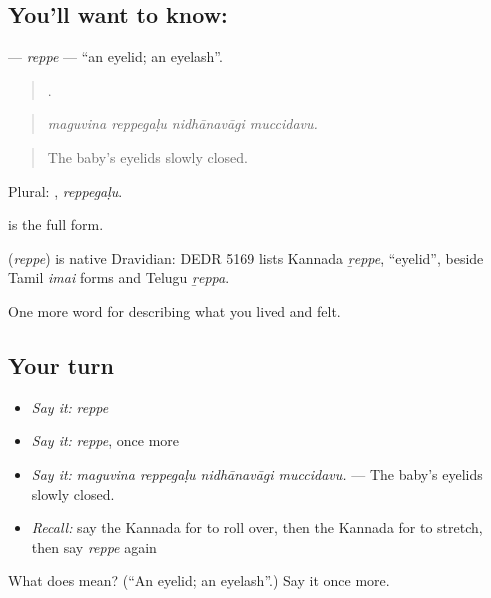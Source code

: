 \subsection*{You'll want to know: }
\textbf{} — \emph{reppe} — \textquotedblleft{}an eyelid; an eyelash\textquotedblright{}.

\begin{quote}
   .
\end{quote}

\begin{quote}
\emph{maguvina reppegaḷu nidhānavāgi muccidavu.}
\end{quote}

\begin{quote}
The baby's eyelids slowly closed.
\end{quote}

Plural: , \emph{reppegaḷu}.

 is the full form.

\begin{cousinweb}
\textbf{} (\emph{reppe}) is native Dravidian: DEDR 5169 lists Kannada \emph{ṟeppe}, \textquotedblleft{}eyelid\textquotedblright{}, beside Tamil \emph{imai} forms and Telugu \emph{ṟeppa}.
\end{cousinweb}

\begin{grammarlens}[title={What you've built}]
One more word for describing what you lived and felt.
\end{grammarlens}

\subsection*{Your turn}
\begin{itemize}
\raggedright
  \item \emph{Say it:} \emph{reppe}
  \item \emph{Say it:} \emph{reppe}, once more
  \item \emph{Say it:} \emph{maguvina reppegaḷu nidhānavāgi muccidavu.} — The baby's eyelids slowly closed.
  \item \emph{Recall:} say the Kannada for to roll over, then the Kannada for to stretch, then say \emph{reppe} again
\end{itemize}

\begin{tcolorbox}[breakable,colback=teal!4,colframe=teal!35!black,title={Before you move on}]
What does  mean? (\textquotedblleft{}An eyelid; an eyelash\textquotedblright{}.) Say it once more.
\end{tcolorbox}
